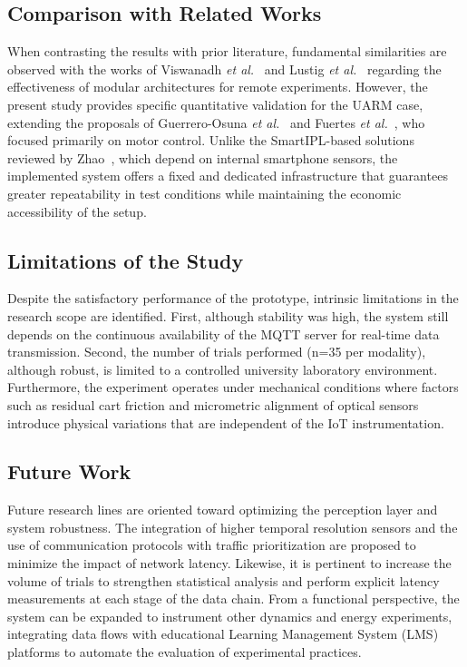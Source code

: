 \documentclass[sensors,article,submit,pdftex]{Definitions/mdpi}
\begin{document}
\subsection{Comparison with Related Works}

When contrasting the results with prior literature, fundamental similarities are observed with the works of Viswanadh \textit{et al.}~\cite{r2} and Lustig \textit{et al.}~\cite{r5} regarding the effectiveness of modular architectures for remote experiments. However, the present study provides specific quantitative validation for the UARM case, extending the proposals of Guerrero-Osuna \textit{et al.}~\cite{r4} and Fuertes \textit{et al.}~\cite{r3}, who focused primarily on motor control. Unlike the SmartIPL-based solutions reviewed by Zhao~\cite{r6}, which depend on internal smartphone sensors, the implemented system offers a fixed and dedicated infrastructure that guarantees greater repeatability in test conditions while maintaining the economic accessibility of the setup.

\subsection{Limitations of the Study}

Despite the satisfactory performance of the prototype, intrinsic limitations in the research scope are identified. First, although stability was high, the system still depends on the continuous availability of the MQTT server for real-time data transmission. Second, the number of trials performed (n=35 per modality), although robust, is limited to a controlled university laboratory environment. Furthermore, the experiment operates under mechanical conditions where factors such as residual cart friction and micrometric alignment of optical sensors introduce physical variations that are independent of the IoT instrumentation.

\subsection{Future Work}

Future research lines are oriented toward optimizing the perception layer and system robustness. The integration of higher temporal resolution sensors and the use of communication protocols with traffic prioritization are proposed to minimize the impact of network latency. Likewise, it is pertinent to increase the volume of trials to strengthen statistical analysis and perform explicit latency measurements at each stage of the data chain. From a functional perspective, the system can be expanded to instrument other dynamics and energy experiments, integrating data flows with educational Learning Management System (LMS) platforms to automate the evaluation of experimental practices.
\end{document}
